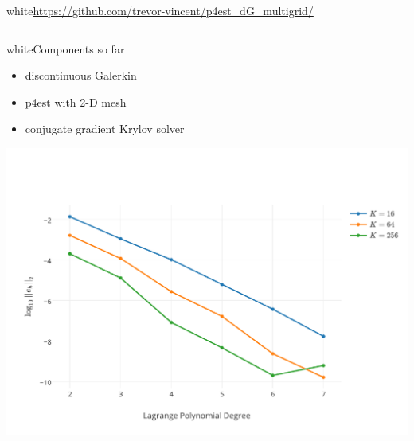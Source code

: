 {\begin{mybox}{white}{\centering \url{https://github.com/trevor-vincent/p4est_dG_multigrid/}}
\begin{columns}
  \begin{column}{.48\textwidth}
\vspace{-.2cm}
\begin{mybox}{white}{\tiny \centering Components so far}
\begin{itemize}[leftmargin=*]
\tiny
\item[\blacksquare]discontinuous Galerkin
\item[\blacksquare]p4est with 2-D mesh
\item[\blacksquare]conjugate gradient Krylov solver
\end{itemize}
\end{mybox}
\vspace{.03cm}
\includegraphics[width=\textwidth]{pictures/Kfixed.pdf}


\end{column}
\end{columns}
\end{mybox}}
